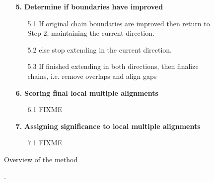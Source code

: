 \documentclass{llncs}
\begin{document}
\begin{figure}[t]
\begin{center}
\begin{minipage}[t]{.50\textwidth}
\begin{flushleft}
\begin{enumerate}
\item[\textbf{5.}] \textbf{Determine if boundaries have improved}
\begin{enumerate}
\item[5.1] If original chain boundaries are improved then
return to Step 2, maintaining the current direction.

\item[5.2] else stop extending in the current direction.
\item[5.3] If finished extending in both directions, then
finalize chains, i.e. remove overlaps and align gaps


\end{enumerate}
\item[\textbf{6.}] \textbf{Scoring final local multiple alignments}
\begin{enumerate}
\item[6.1] FIXME
\end{enumerate}
\item[\textbf{7.}] \textbf{Assigning significance to local multiple alignments}
\begin{enumerate}
\item[7.1] FIXME
\end{enumerate}

\end{enumerate}

\end{flushleft}
 \end{minipage}
 \hfill
 \begin{minipage}[t]{.30\textwidth}
 \begin{flushleft}  

\end{flushleft}  
\end{minipage}
\hfill
\end{center}
\caption{Overview of the method}
\end{figure}
\begin{figure}[t]
\centering {}
\caption{.}

\label{fig:string_matching}\vspace{-0.2cm}
\end{figure}

\begin{comment}
\begin{algorithm}{Allocate-Object}{}
\begin{IF}{free = \NIL}
\ERROR{out of space}
\ELSE
x \= free \\
free \= next[x] \\
\RETURN x
\end{IF}
\end{algorithm}
\end{comment}
\end{document}

